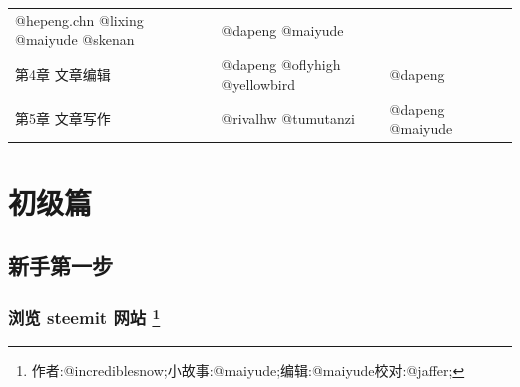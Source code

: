 \documentclass[]{ctexbook}
\begin{document}
\begin{longtable}[]{@{}llll@{}}
\begin{minipage}[t]{0.49\columnwidth}
@hepeng.chn @lixing @maiyude @skenan\strut
\end{minipage} & \begin{minipage}[t]{0.21\columnwidth}\raggedright
@dapeng @maiyude\strut
\end{minipage} & \begin{minipage}[t]{0.06\columnwidth}\raggedright
\strut
\end{minipage}\tabularnewline
\begin{minipage}[t]{0.13\columnwidth}\raggedright
第4章 文章编辑\strut
\end{minipage} & \begin{minipage}[t]{0.49\columnwidth}\raggedright
@dapeng @oflyhigh @yellowbird\strut
\end{minipage} & \begin{minipage}[t]{0.21\columnwidth}\raggedright
@dapeng\strut
\end{minipage} & \begin{minipage}[t]{0.06\columnwidth}\raggedright
\strut
\end{minipage}\tabularnewline
\begin{minipage}[t]{0.13\columnwidth}\raggedright
第5章 文章写作\strut
\end{minipage} & \begin{minipage}[t]{0.49\columnwidth}\raggedright
@rivalhw @tumutanzi\strut
\end{minipage} & \begin{minipage}[t]{0.21\columnwidth}\raggedright
@dapeng @maiyude\strut
\end{minipage} & \begin{minipage}[t]{0.06\columnwidth}\raggedright
\strut
\end{minipage}\tabularnewline
\bottomrule
\end{longtable}

\mainmatter

\hypertarget{cjp}{%
\part{初级篇}\label{cjp}}

\hypertarget{xsdyb}{%
\chapter{新手第一步}\label{xsdyb}}

\hypertarget{-steemit-}{%
\section[浏览 steemit 网站 ]{\texorpdfstring{浏览 steemit 网站 \footnote{作者:@incrediblesnow;小故事:@maiyude;编辑:@maiyude校对:@jaffer;}}{浏览 steemit 网站 }}\label{-steemit-}}
\end{document}
